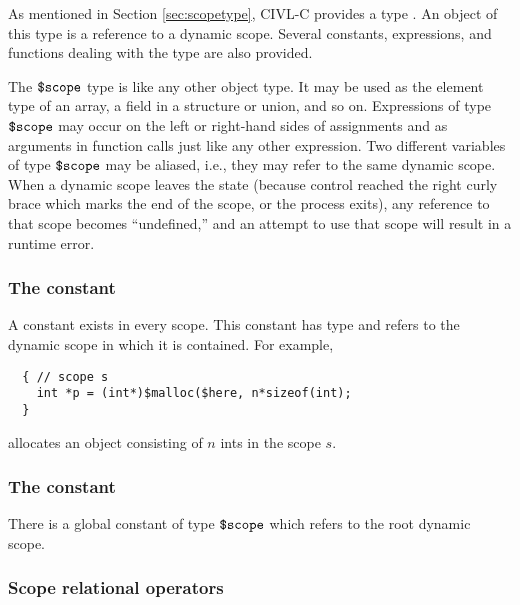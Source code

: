 As mentioned in Section \ref{sec:scopetype}, CIVL-C provides a type
\cscope.  An object of this type is a reference to a dynamic scope.
Several constants, expressions, and functions dealing with the
\cscope{} type are also provided.

The $\mbox{\texttt{\${}scope}}$ type is like any other object type.  It may be used as
the element type of an array, a field in a structure or union, and so
on.  Expressions of type $\mbox{\texttt{\${}scope}}$ may occur on the left or right-hand
sides of assignments and as arguments in function calls just like any
other expression.  Two different variables of type $\mbox{\texttt{\${}scope}}$ may be
aliased, i.e., they may refer to the same dynamic scope.  When a
dynamic scope leaves the state (because control reached the right
curly brace which marks the end of the scope, or the process exits),
any reference to that scope becomes ``undefined,'' and an attempt to
use that scope will result in a runtime error.

\subsubsection{The constant \chere}

A constant \chere{} exists in every scope.  This constant has
type \cscope{} and refers to the dynamic scope in which it is
contained.  For example,
\begin{verbatim}
  { // scope s
    int *p = (int*)$malloc($here, n*sizeof(int);
  }
\end{verbatim}
allocates an object consisting of $n$ ints in the scope $s$.

\subsubsection{The constant \cscoperoot{}}

There is a global constant \cscoperoot{} of type $\mbox{\texttt{\${}scope}}$ which
refers to the root dynamic scope.

\subsubsection{Scope relational operators}

